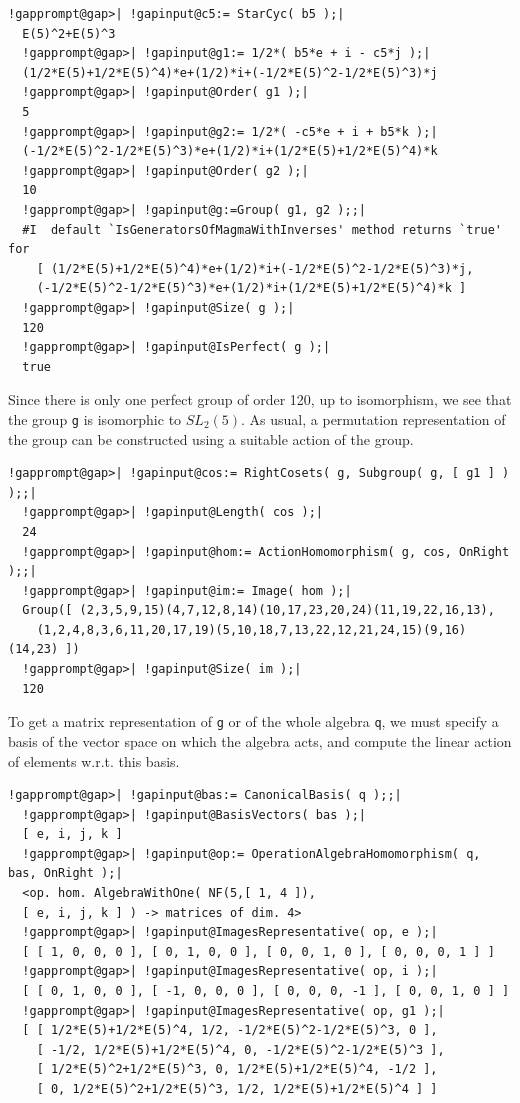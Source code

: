 \documentclass[a4paper,11pt]{report}
\begin{document}
{{ 
\begin{Verbatim}[commandchars=!@|,fontsize=\small,frame=single,label=Example]
  !gapprompt@gap>| !gapinput@c5:= StarCyc( b5 );|
  E(5)^2+E(5)^3
  !gapprompt@gap>| !gapinput@g1:= 1/2*( b5*e + i - c5*j );|
  (1/2*E(5)+1/2*E(5)^4)*e+(1/2)*i+(-1/2*E(5)^2-1/2*E(5)^3)*j
  !gapprompt@gap>| !gapinput@Order( g1 );|
  5
  !gapprompt@gap>| !gapinput@g2:= 1/2*( -c5*e + i + b5*k );|
  (-1/2*E(5)^2-1/2*E(5)^3)*e+(1/2)*i+(1/2*E(5)+1/2*E(5)^4)*k
  !gapprompt@gap>| !gapinput@Order( g2 );|
  10
  !gapprompt@gap>| !gapinput@g:=Group( g1, g2 );;|
  #I  default `IsGeneratorsOfMagmaWithInverses' method returns `true' for
    [ (1/2*E(5)+1/2*E(5)^4)*e+(1/2)*i+(-1/2*E(5)^2-1/2*E(5)^3)*j,
    (-1/2*E(5)^2-1/2*E(5)^3)*e+(1/2)*i+(1/2*E(5)+1/2*E(5)^4)*k ]
  !gapprompt@gap>| !gapinput@Size( g );|
  120
  !gapprompt@gap>| !gapinput@IsPerfect( g );|
  true
\end{Verbatim}
 

 Since there is only one perfect group of order 120, up to isomorphism, we see
that the group \texttt{g} is isomorphic to $SL_2(5)$. As usual, a permutation representation of the group can be constructed using
a suitable action of the group. 

 
\begin{Verbatim}[commandchars=!@|,fontsize=\small,frame=single,label=Example]
  !gapprompt@gap>| !gapinput@cos:= RightCosets( g, Subgroup( g, [ g1 ] ) );;|
  !gapprompt@gap>| !gapinput@Length( cos );|
  24
  !gapprompt@gap>| !gapinput@hom:= ActionHomomorphism( g, cos, OnRight );;|
  !gapprompt@gap>| !gapinput@im:= Image( hom );|
  Group([ (2,3,5,9,15)(4,7,12,8,14)(10,17,23,20,24)(11,19,22,16,13),
    (1,2,4,8,3,6,11,20,17,19)(5,10,18,7,13,22,12,21,24,15)(9,16)(14,23) ])
  !gapprompt@gap>| !gapinput@Size( im );|
  120
\end{Verbatim}
 

 To get a matrix representation of \texttt{g} or of the whole algebra \texttt{q}, we must specify a basis of the vector space on which the algebra acts, and
compute the linear action of elements w.r.t. this basis. 

 
\begin{Verbatim}[commandchars=!@|,fontsize=\small,frame=single,label=Example]
  !gapprompt@gap>| !gapinput@bas:= CanonicalBasis( q );;|
  !gapprompt@gap>| !gapinput@BasisVectors( bas );|
  [ e, i, j, k ]
  !gapprompt@gap>| !gapinput@op:= OperationAlgebraHomomorphism( q, bas, OnRight );|
  <op. hom. AlgebraWithOne( NF(5,[ 1, 4 ]),
  [ e, i, j, k ] ) -> matrices of dim. 4>
  !gapprompt@gap>| !gapinput@ImagesRepresentative( op, e );|
  [ [ 1, 0, 0, 0 ], [ 0, 1, 0, 0 ], [ 0, 0, 1, 0 ], [ 0, 0, 0, 1 ] ]
  !gapprompt@gap>| !gapinput@ImagesRepresentative( op, i );|
  [ [ 0, 1, 0, 0 ], [ -1, 0, 0, 0 ], [ 0, 0, 0, -1 ], [ 0, 0, 1, 0 ] ]
  !gapprompt@gap>| !gapinput@ImagesRepresentative( op, g1 );|
  [ [ 1/2*E(5)+1/2*E(5)^4, 1/2, -1/2*E(5)^2-1/2*E(5)^3, 0 ],
    [ -1/2, 1/2*E(5)+1/2*E(5)^4, 0, -1/2*E(5)^2-1/2*E(5)^3 ],
    [ 1/2*E(5)^2+1/2*E(5)^3, 0, 1/2*E(5)+1/2*E(5)^4, -1/2 ],
    [ 0, 1/2*E(5)^2+1/2*E(5)^3, 1/2, 1/2*E(5)+1/2*E(5)^4 ] ]
\end{Verbatim}
 }

}
\end{document}
